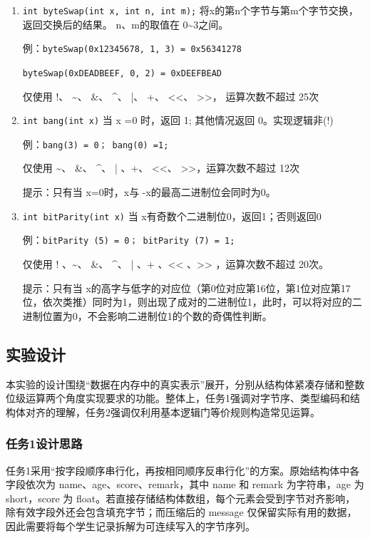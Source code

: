\documentclass[supercite]{Experimental_Report}
\theoremstyle{definition}
\begin{document}
\begin{enumerate}
  \item \texttt{int byteSwap(int x, int n, int m);}  将x的第n个字节与第m个字节交换，返回交换后的结果。 n、m的取值在 0\textasciitilde{}3之间。

例：\texttt{byteSwap(0x12345678, 1, 3) = 0x56341278}

\phantom{例：}\texttt{byteSwap(0xDEADBEEF, 0, 2) = 0xDEEFBEAD}

仅使用 !、 \textasciitilde{}、 \&、 \^{}、 |、 +、 <<、 >>， 运算次数不超过 25次

  \item \texttt{int bang(int x)}    当 x =0 时，返回 1; 其他情况返回 0。实现逻辑非(!)

例：\texttt{bang(3) = 0；  bang(0) =1;}

仅使用 \textasciitilde{}、 \&、 \^{}、 | 、+、 <<、 >>，运算次数不超过 12次

提示：只有当 x=0时，x与 -x的最高二进制位会同时为0。

  \item \texttt{int bitParity(int x)}    当 x有奇数个二进制位0，返回1；否则返回0

例：\texttt{bitParity (5) = 0；  bitParity (7) = 1;}

仅使用 ! 、\textasciitilde{}、 \&、 \^{}、 | 、+ 、<< 、>>  ，运算次数不超过 20次。

提示：只有当 x的高字与低字的对应位（第0位对应第16位，第1位对应第17位，依次类推）同时为1，则出现了成对的二进制位1，此时，可以将对应的二进制位置为0，不会影响二进制位1的个数的奇偶性判断。
\end{enumerate}

\subsection{实验设计}

本实验的设计围绕“数据在内存中的真实表示”展开，分别从结构体紧凑存储和整数位级运算两个角度实现要求的功能。整体上，任务1强调对字节序、类型编码和结构体对齐的理解，任务2强调仅利用基本逻辑门等价规则构造常见运算。

\subsubsection{任务1设计思路}
任务1采用“按字段顺序串行化，再按相同顺序反串行化”的方案。原始结构体中各字段依次为 name、age、score、remark，其中 name 和 remark 为字符串，age 为 short，score 为 float。若直接存储结构体数组，每个元素会受到字节对齐影响，除有效字段外还会包含填充字节；而压缩后的 message 仅保留实际有用的数据，因此需要将每个学生记录拆解为可连续写入的字节序列。
\end{document}
